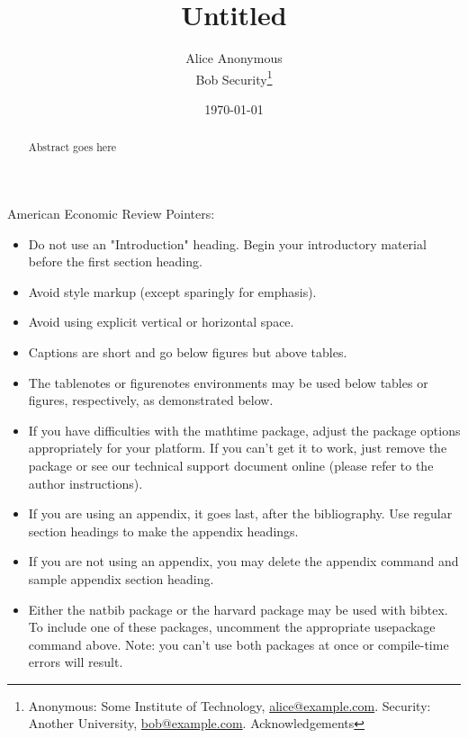 \documentclass[AER]{AEA}
\begin{document}
\title{Untitled}


\author{
  Alice Anonymous\\
  Bob Security\thanks{
  Anonymous: Some Institute of
Technology, \href{mailto:alice@example.com}{alice@example.com}.
  Security: Another
University, \href{mailto:bob@example.com}{bob@example.com}.
  Acknowledgements
}
}

\date{\today}

\begin{abstract}
Abstract goes here
\end{abstract}


\maketitle

American Economic Review Pointers:

\begin{itemize}
\item Do not use an "Introduction" heading. Begin your introductory material
before the first section heading.

\item Avoid style markup (except sparingly for emphasis).

\item Avoid using explicit vertical or horizontal space.

\item Captions are short and go below figures but above tables.

\item The tablenotes or figurenotes environments may be used below tables
or figures, respectively, as demonstrated below.

\item If you have difficulties with the mathtime package, adjust the package
options appropriately for your platform. If you can't get it to work, just
remove the package or see our technical support document online (please
refer to the author instructions).

\item If you are using an appendix, it goes last, after the bibliography.
Use regular section headings to make the appendix headings.

\item If you are not using an appendix, you may delete the appendix command
and sample appendix section heading.

\item Either the natbib package or the harvard package may be used with bibtex.
To include one of these packages, uncomment the appropriate usepackage command
above. Note: you can't use both packages at once or compile-time errors will result.

\end{itemize}
\end{document}
